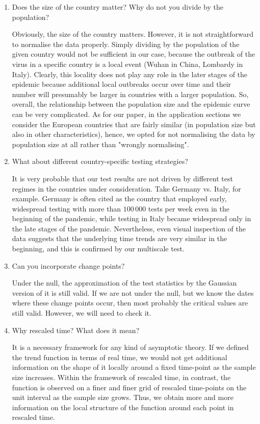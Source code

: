 \documentclass[a4paper,12pt]{article}
\numberwithin{equation}{section}
\begin{document}
\begin{enumerate}
\item Does the size of the country matter? Why do not you divide by the population?
	
	Obviously, the size of the country matters. However, it is not straightforward to normalise the data properly. Simply dividing by the population of the given country would not be sufficient in our case, because the outbreak of the virus in a specific country is a local event (Wuhan in China, Lombardy in Italy). Clearly, this locality does not play any role in the later stages of the epidemic because additional local outbreaks occur over time and their number will presumably be larger in countries with a larger population. So, overall, the relationship between the population size and the epidemic curve can be very complicated. As for our paper, in the application sections we consider the European countries that are fairly similar (in population size but also in other characteristics), hence, we opted for not normalising the data by population size at all rather than "wrongly normalising".
	\item What about different country-specific testing strategies?
	
It is very probable that our test results are not driven by different test regimes in the countries under consideration. Take Germany vs. Italy, for example. Germany is often cited as the country that employed early, widespread testing with more than $100\,000$ tests per week even in the beginning of the pandemic, while testing in Italy became widespread only in the late stages of the pandemic. Nevertheless, even visual inspection of the data suggests that the underlying time trends are very similar in the beginning, and this is confirmed by our multiscale test.
	\item Can you incorporate change points?
	
	Under the null, the approximation of the test statistics by the Gaussian version of it is still valid. If we are not under the null, but we know the dates where these change points occur, then most probably the critical values are still valid. However, we will need to check it.
	
	\item Why rescaled time? What does it mean?
	
It is a necessary framework for any kind of asymptotic theory. If we defined the trend function in terms of real time, we would not get additional information on the shape of it locally around a fixed time-point as the sample size increases. Within the framework of rescaled time, in contrast, the function is observed on a finer and finer grid of rescaled time-points on the unit interval as the sample size grows. Thus, we obtain more and more information on the local structure of the function around each point in rescaled time.

\end{enumerate}
\end{document}
